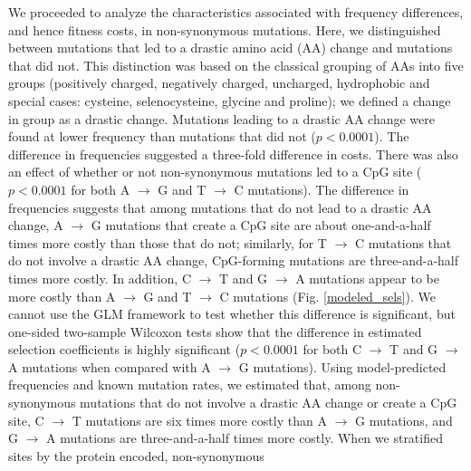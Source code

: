 \documentclass{article}
\begin{document}
We proceeded to analyze the characteristics associated with frequency differences, and hence fitness costs, in non-synonymous mutations. Here, we distinguished between mutations that led to a drastic amino acid (AA) change and mutations that did not. This distinction was based on the classical grouping of AAs into five groups (positively charged, negatively charged, uncharged, hydrophobic and special cases: cysteine, selenocysteine, glycine and proline); 
we defined a change in group as a drastic change. 
Mutations leading to a drastic AA change were found at lower frequency than mutations that did not ($p < 0.0001$). The difference in frequencies suggested a three-fold difference in costs. 
There was also an effect of whether or not non-synonymous mutations led to a CpG site ($p < 0.0001$ for both A $\rightarrow$ G and T $\rightarrow$ C mutations). The difference in frequencies suggests that among mutations that do not lead to a drastic AA change, A $\rightarrow$ G mutations that create a CpG site are about one-and-a-half times more costly than those that do not; similarly, for T $\rightarrow$ C mutations that do not involve a drastic AA change, CpG-forming mutations are three-and-a-half times more costly. In addition, C $\rightarrow$ T and G $\rightarrow$ A mutations appear to be more costly than A $\rightarrow$ G and T $\rightarrow$ C mutations (Fig. \ref{modeled_sels}). We cannot use the GLM framework to test whether this difference is significant, but one-sided two-sample Wilcoxon tests show that the difference in estimated selection coefficients is highly significant ($p < 0.0001$ for both C $\rightarrow$ T and G $\rightarrow$ A mutations when compared with A $\rightarrow$ G mutations). Using model-predicted frequencies and known mutation rates, we estimated that, among non-synonymous mutations that do not involve a drastic AA change or create a CpG site, %
C $\rightarrow$ T mutations are six times more costly than A $\rightarrow$ G mutations, and G $\rightarrow$ A mutations are three-and-a-half times more costly.
When we stratified sites by the protein encoded, non-synonymous %
\end{document}
